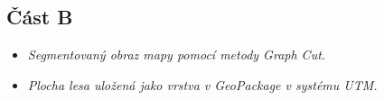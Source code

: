 \subsection*{Část B}
\begin{itemize}
    \item \textit{Segmentovaný obraz mapy pomocí metody Graph Cut.}
    \item \textit{Plocha lesa uložená jako vrstva v GeoPackage v systému UTM.}
\end{itemize}